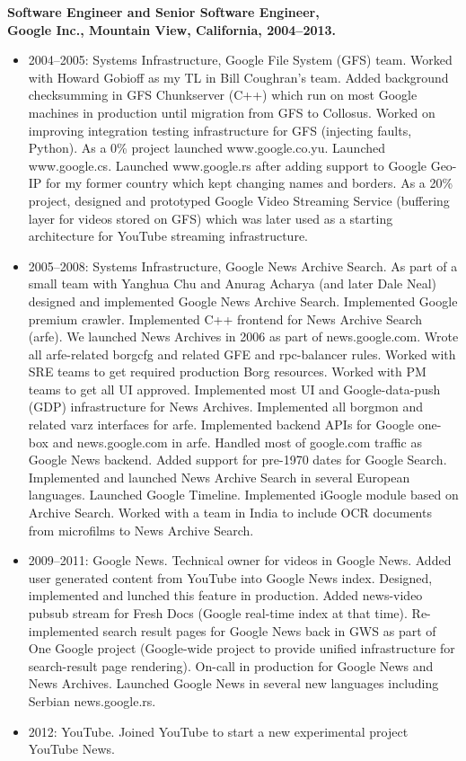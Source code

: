 \documentclass[10pt]{article}
\begin{document}
{\bf Software Engineer and Senior Software Engineer,\\
Google Inc., Mountain View, California, 2004--2013.}
\begin{itemize}
\vspace{-5pt}
\item
2004--2005: Systems Infrastructure, Google File System (GFS) team. Worked with Howard Gobioff as my TL in Bill Coughran's team. Added background checksumming in GFS Chunkserver (C++) which run on most Google machines in production until migration from GFS to Collosus. Worked on improving integration testing infrastructure for GFS (injecting faults, Python).
As a 0\% project launched www.google.co.yu. Launched www.google.cs. Launched www.google.rs after adding support to Google Geo-IP for my former country which kept changing names and borders. As a 20\% project, designed and prototyped Google Video Streaming Service (buffering layer for videos stored on GFS) which was later used as a starting architecture for YouTube streaming infrastructure.
\item
2005--2008: Systems Infrastructure, Google News Archive Search. As part of a small team with Yanghua Chu and Anurag Acharya (and later Dale Neal) designed and implemented Google News Archive Search. Implemented Google premium crawler. Implemented C++ frontend for News Archive Search (arfe). We launched News Archives in 2006 as part of news.google.com. Wrote all arfe-related borgcfg and related GFE and rpc-balancer rules. Worked with SRE teams to get required production Borg resources. Worked with PM teams to get all UI approved. Implemented most UI and Google-data-push (GDP) infrastructure for News Archives. Implemented all borgmon and related varz interfaces for arfe. Implemented backend APIs for Google one-box and news.google.com in arfe. Handled most of google.com traffic as Google News backend. Added support for pre-1970 dates for Google Search. Implemented and launched News Archive Search in several European languages. Launched Google Timeline. Implemented iGoogle module based on Archive Search. Worked with a team in India to include OCR documents from microfilms to News Archive Search.
\item
2009--2011: Google News. Technical owner for videos in Google News. Added user generated content from YouTube into Google News index. Designed, implemented and lunched this feature in production. Added news-video pubsub stream for Fresh Docs (Google real-time index at that time). Re-implemented search result pages for Google News back in GWS as part of One Google project (Google-wide project to provide unified infrastructure for search-result page rendering). On-call in production for Google News and News Archives. Launched Google News in several new languages including Serbian news.google.rs.
\item
2012: YouTube. Joined YouTube to start a new experimental project YouTube News.
\end{itemize}
\end{document}
